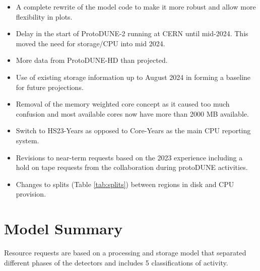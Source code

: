 \documentclass[12pt]{article}
\begin{document}
\begin{itemize}
\item A complete rewrite of the model code to make it more robust and allow more flexibility in plots. 
\item Delay in the start of ProtoDUNE-2 running at CERN until mid-2024. This moved the need for storage/CPU into mid 2024.  
\item More data from ProtoDUNE-HD than projected. 
\item Use of existing storage information up to August 2024 in forming a baseline for future projections. 
\item Removal of the memory weighted core concept as it caused too much confusion and most available cores now have more than 2000 MB available. 
\item Switch to HS23-Years as opposed to Core-Years as the main CPU reporting system.
\item Revisions to near-term requests based on the 2023 experience including a hold on tape requests from the collaboration during protoDUNE activities. 
\item Changes to splits (Table \ref{tab:splits}) between regions in disk and CPU provision. 
\end{itemize}

\section{Model Summary}

Resource requests are based on a processing and storage model that separated different phases of the detectors and includes 5 classifications of activity.
\end{document}
